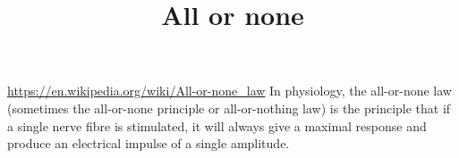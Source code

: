 \documentclass[a4paper]{standalone}
\title{All or none}
\begin{document}
    \maketitle
    \url{https://en.wikipedia.org/wiki/All-or-none_law}
    In physiology, the all-or-none law (sometimes the all-or-none principle or all-or-nothing law) is the principle that if a single nerve fibre is stimulated, it will always give a maximal response and produce an electrical impulse of a single amplitude.
\end{document}
